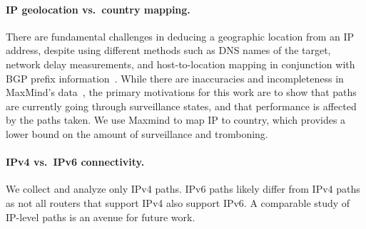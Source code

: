 \paragraph{IP geolocation vs.\ country mapping.}
There are fundamental challenges in deducing a geographic location
from an IP address, 
despite using different methods such as DNS names of the target,
network delay measurements, and host-to-location mapping in
conjunction with BGP prefix
information~\cite{padmanabhan2001investigation}.  While there are
inaccuracies and incompleteness in MaxMind's
data~\cite{huffaker2011geocompare}, the primary motivations for this work are to show that paths 
are currently going through surveillance states, and that performance is affected by the 
paths taken.  We use Maxmind to map IP to
country,
which provides a lower
bound on the amount of surveillance and tromboning.

\paragraph{IPv4 vs.\ IPv6 connectivity.}
We collect and analyze only IPv4 paths.  IPv6 paths likely
differ from IPv4 paths as not all routers that support IPv4 also support
IPv6.  A comparable study of IP-level paths is an avenue for future work.

